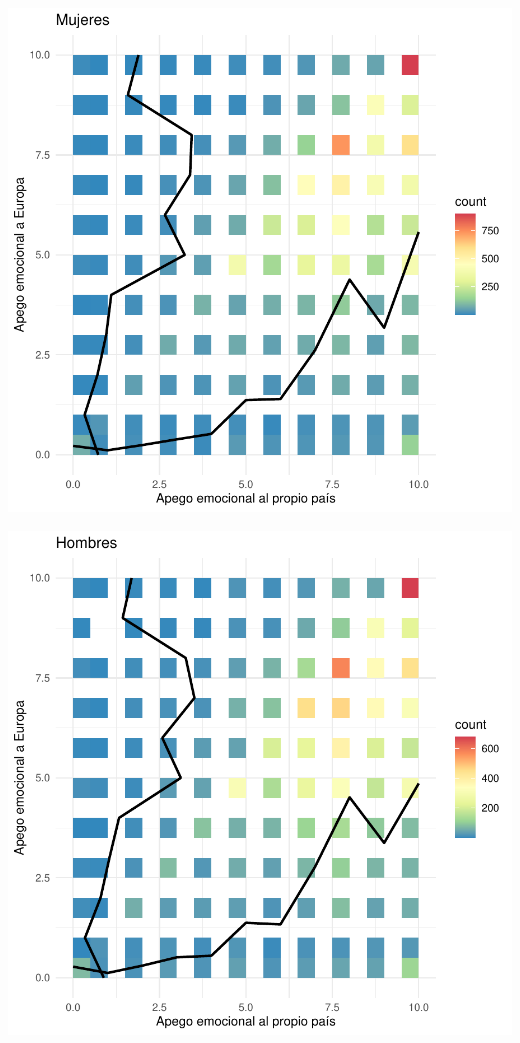 \documentclass{article}
\begin{document}
\includegraphics{Informe-005}

\includegraphics{Informe-006}

\newpage
\end{document}

